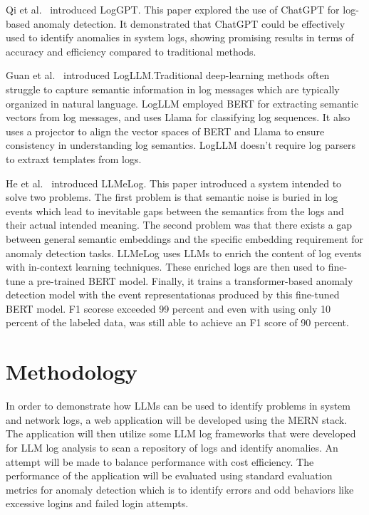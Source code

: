 \documentclass[sigconf]{acmart}
\begin{document}
Qi et al.~\cite{10466820} introduced LogGPT. This paper explored the use of ChatGPT for log-based anomaly detection. It demonstrated that ChatGPT could be effectively used to identify anomalies in system logs, showing promising results in terms of accuracy and efficiency compared to traditional methods.

Guan et al.~\cite{guan2025logllmlogbasedanomalydetection} introduced LogLLM.Traditional deep-learning methods often struggle to capture semantic information in log messages which are typically organized in natural language. LogLLM employed BERT for extracting semantic vectors from log messages, and uses Llama for classifying log sequences. It also uses a projector to align the vector spaces of BERT and Llama to ensure consistency in understanding log semantics. LogLLM doesn't require log parsers to extraxt templates from logs.

He et al.~\cite{10771398} introduced LLMeLog. This paper introduced a system intended to solve two problems. The first problem is that semantic noise is buried in log events which lead to inevitable gaps between the semantics from the logs and their actual intended meaning. The second problem was that there exists a gap between general semantic embeddings and the specific embedding requirement for anomaly detection tasks. LLMeLog uses LLMs to enrich the content of log events with in-context learning techniques. These enriched logs are then used to fine-tune a pre-trained BERT model. Finally, it trains a transformer-based anomaly detection model with the event representationas produced by this fine-tuned BERT model. F1 scorese exceeded 99 percent and even with using only 10 percent of the labeled data, was still able to achieve an F1 score of 90 percent.


\section{Methodology}

In order to demonstrate how LLMs can be used to identify problems in system and network logs, a web application will be developed using the MERN stack. The application will then utilize some LLM log frameworks that were developed for LLM log analysis to scan a repository of logs and identify anomalies. An attempt will be made to balance performance with cost efficiency. The performance of the application will be evaluated using standard evaluation metrics for anomaly detection which is to identify errors and odd behaviors like excessive logins and failed login attempts.
\end{document}
